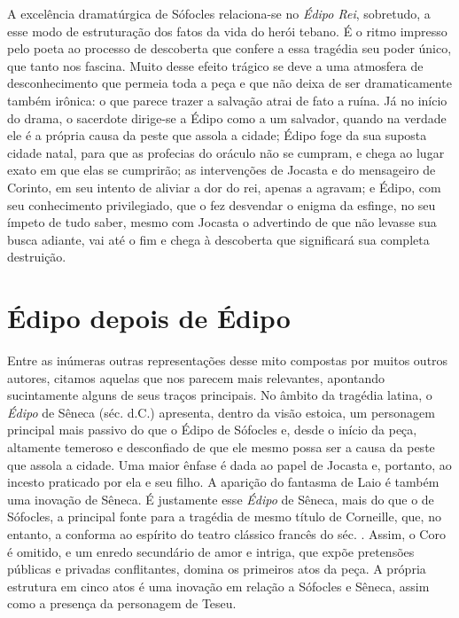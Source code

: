 A excelência dramatúrgica de Sófocles relaciona-se no \emph{Édipo Rei},
sobretudo, a esse modo de estruturação dos fatos da vida do herói
tebano. É o ritmo impresso pelo poeta ao processo de descoberta que
confere a essa tragédia seu poder único, que tanto nos fascina. Muito
desse efeito trágico se deve a uma atmosfera de desconhecimento que
permeia toda a peça e que não deixa de ser dramaticamente também
irônica: o que parece trazer a salvação atrai de fato a ruína. Já no
início do drama, o sacerdote dirige-se a Édipo como a um salvador,
quando na verdade ele é a própria causa da peste que assola a cidade;
Édipo foge da sua suposta cidade natal, para que as profecias do oráculo
não se cumpram, e chega ao lugar exato em que elas se cumprirão; as
intervenções de Jocasta e do mensageiro de Corinto, em seu intento de
aliviar a dor do rei, apenas a agravam; e Édipo, com seu conhecimento
privilegiado, que o fez desvendar o enigma da esfinge, no seu ímpeto de
tudo saber, mesmo com Jocasta o advertindo de que não levasse sua busca
adiante, vai até o fim e chega à descoberta que significará sua completa
destruição.



\section{Édipo depois de Édipo}


Entre as inúmeras outras representações desse mito compostas por muitos
outros autores, citamos aquelas que nos parecem mais relevantes,
apontando sucintamente alguns de seus traços principais. No âmbito da
tragédia latina, o \emph{Édipo} de Sêneca (séc.  d.C.)
apresenta, dentro da visão estoica, um personagem principal mais passivo
do que o Édipo de Sófocles e, desde o início da peça, altamente temeroso
e desconfiado de que ele mesmo possa ser a causa da peste que assola a
cidade. Uma maior ênfase é dada ao papel de Jocasta e, portanto, ao
incesto praticado por ela e seu filho. A aparição do fantasma de Laio é
também uma inovação de Sêneca. É justamente esse \emph{Édipo} de Sêneca,
mais do que o de Sófocles, a principal fonte para a tragédia de mesmo
título de Corneille, que, no entanto, a conforma ao espírito do
teatro clássico francês do séc. . Assim, o Coro é omitido, e um
enredo secundário de amor e intriga, que expõe pretensões públicas e
privadas conflitantes, domina os primeiros atos da peça. A própria
estrutura em cinco atos é uma inovação em relação a Sófocles e Sêneca,
assim como a presença da personagem de Teseu.

